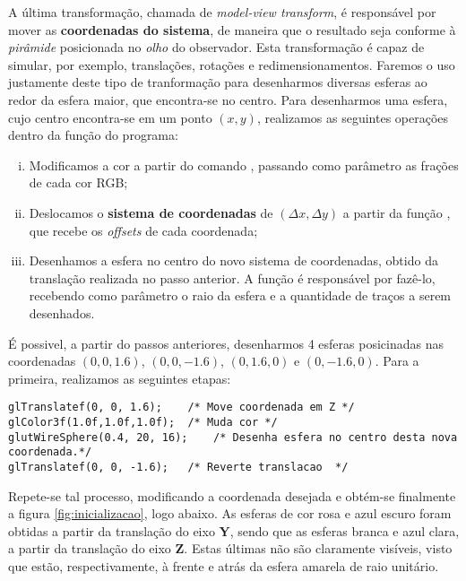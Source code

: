 \documentclass[12pt, a4paper]{article}
\begin{document}
\vspace{12pt}

A última transformação, chamada de \textit{model-view transform}, é
responsável por mover as \textbf{coordenadas do sistema}, de maneira que o
resultado seja conforme à \textit{pirâmide} posicionada no \textit{olho} do
observador. Esta transformação é capaz de simular, por exemplo, translações,
rotações e redimensionamentos. Faremos o uso justamente deste tipo de
tranformação para desenharmos diversas esferas ao redor da esfera maior, que
encontra-se no centro. Para desenharmos uma esfera, cujo centro encontra-se em
um ponto \((x,y)\), realizamos as seguintes operações dentro da função
 do programa:

\begin{enumerate} [i.]
  \item Modificamos a cor a partir do comando , passando como
  parâmetro as frações de cada cor RGB;
  \item Deslocamos o \textbf{sistema de coordenadas} de \((\Delta x ,
  \Delta y)\) a partir da função , que recebe os
  \textit{offsets} de cada coordenada;
  \item Desenhamos a esfera no centro do novo sistema de coordenadas, obtido da
  translação realizada no passo anterior. A função  é
  responsável por fazê-lo, recebendo como parâmetro o raio da esfera e a
  quantidade de traços a serem desenhados.
\end{enumerate}

É possivel, a partir do passos anteriores, desenharmos 4 esferas posicinadas nas
coordenadas \((0, 0, 1.6)\), \((0, 0, -1.6)\), \((0, 1.6, 0)\) e \((0, -1.6,
0)\). Para a primeira, realizamos as seguintes etapas:

\begin{lstlisting}[keywordstyle=\ttfamily, style=nonumbers]
glTranslatef(0, 0, 1.6);	/* Move coordenada em Z */
glColor3f(1.0f,1.0f,1.0f);	/* Muda cor */
glutWireSphere(0.4, 20, 16);    /* Desenha esfera no centro desta nova coordenada.*/ 
glTranslatef(0, 0, -1.6);	/* Reverte translacao  */
\end{lstlisting}

Repete-se tal processo, modificando a coordenada desejada e obtém-se finalmente
a figura \ref{fig:inicializacao}, logo abaixo. As esferas de cor rosa e azul
escuro foram obtidas a partir da translação do eixo \textbf{Y}, sendo que as
esferas branca e azul clara, a partir da translação do eixo \textbf{Z}. Estas
últimas não são claramente visíveis, visto que estão, respectivamente, à frente
e atrás da esfera amarela de raio unitário.
\end{document}
